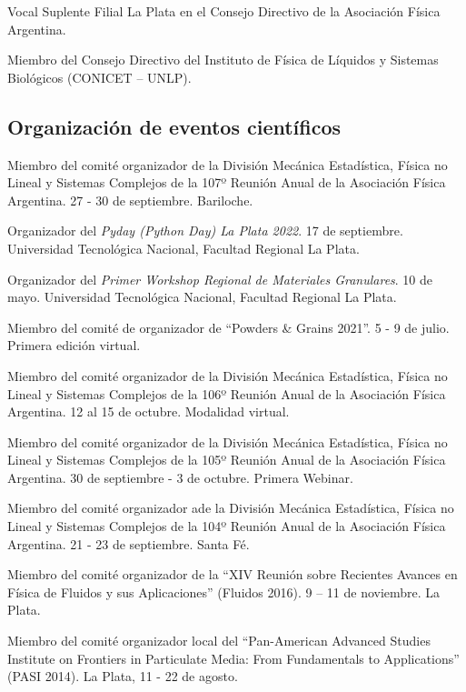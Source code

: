    Vocal Suplente Filial La Plata en el Consejo Directivo de la Asociación Física Argentina.
  
   Miembro del Consejo Directivo del Instituto de Física de Líquidos y Sistemas Biológicos (CONICET -- UNLP).
  


\subsection{Organización de eventos científicos}

 Miembro del comité organizador de la División Mecánica Estadística, Física no Lineal y Sistemas Complejos de la 107º Reunión Anual de la Asociación Física Argentina. 27 - 30 de septiembre. Bariloche.

 Organizador del \textit{Pyday (Python Day) La Plata 2022}. 17 de septiembre. Universidad Tecnológica Nacional, Facultad Regional La Plata.

 Organizador del \textit{Primer Workshop Regional de Materiales Granulares}. 10 de mayo. Universidad Tecnológica Nacional, Facultad Regional La Plata.

 Miembro del comité de organizador de ``Powders \& Grains 2021''. 5 - 9 de julio. Primera edición virtual.

 Miembro del comité organizador de la División Mecánica Estadística, Física no Lineal y Sistemas Complejos de la 106º Reunión Anual de la Asociación Física Argentina. 12 al 15 de octubre. Modalidad virtual.

 Miembro del comité organizador de la División Mecánica Estadística, Física no Lineal y Sistemas Complejos de la 105º Reunión Anual de la Asociación Física Argentina. 30 de septiembre - 3 de octubre. Primera Webinar.

 Miembro del comité organizador ade la División Mecánica Estadística, Física no Lineal y Sistemas Complejos de la 104º Reunión Anual de la Asociación Física Argentina. 21 - 23 de septiembre. Santa Fé.

 Miembro del comité organizador de la ``XIV Reunión sobre Recientes Avances en Física de Fluidos y sus Aplicaciones'' (Fluidos 2016). 9 -- 11 de noviembre. La Plata.

 Miembro del comité organizador local del ``Pan-American Advanced Studies Institute on Frontiers in Particulate Media: From Fundamentals to Applications'' (PASI 2014). La Plata, 11 - 22 de agosto.
